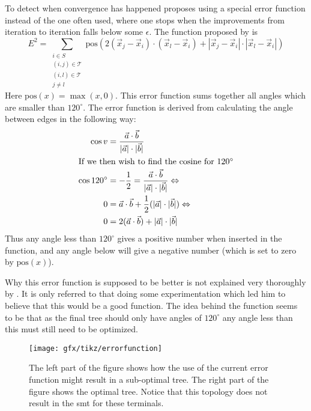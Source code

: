 To detect when convergence has happened \citeauthor{smith1992} proposes using a special
error function instead of the one often used, where one stops when the
improvements from iteration to iteration falls below some $\epsilon$. The
function proposed by \citeauthor{smith1992} is
%
\begin{equation}
  E^2 = \sum_{
    \begin{array}{c} i \in S \\ (i,j) \in \mathcal{T} \\ (i,l) \in \mathcal{T} \\ j \ne l
    \end{array}} \text{pos} (2 (\vec x_j - \vec x_i) \cdot (\vec x_l - \vec x_i)
  + | \vec x_j - \vec x_i | \cdot | \vec x_l - \vec x_i |) \label{eq:28}
\end{equation}
%
Here $\text{pos}(x) = \max(x, 0)$. This error function sums together all angles which
are smaller than $120^{\circ}$. The error function is derived from calculating
the angle between edges in the following way:
%
\begin{align}
  \cos v & = \frac{\vec a \cdot \vec b}
           {|\vec a| \cdot |\vec b|}                 \\
  \intertext{If we then wish to find the cosine for $120^{\circ}$}
  \cos 120^{\circ}
         & = -\frac{1}{2} = \frac{\vec a \cdot \vec b}
           {|\vec a| \cdot |\vec b|} \Leftrightarrow \\
  0      & = \vec a \cdot \vec b + \frac{1}{2}
           (|\vec a| \cdot |\vec b|) \Leftrightarrow \\
  0      & = 2 (\vec a \cdot \vec b) + |\vec a| \cdot |\vec b|
\end{align}
%
Thus any angle less than $120^{\circ}$ gives a positive number when inserted in
the function, and any angle below will give a negative number (which is set to
zero by $\text{pos}(x)$).

Why this error function is supposed to be better is not explained very
thoroughly by \citeauthor{smith1992}. It is only referred to that doing some
experimentation which led him to believe that this would be a good function. The
idea behind the function seems to be that as the final tree should only have
angles of $120^{\circ}$ any angle less than this must still need to be
optimized.

\begin{figure}[htbp]
  \centering
  \texttt{[image: gfx/tikz/errorfunction]}
  \caption[Possible problem with the error function, part 1]{The left part of the figure
    shows how the use of the current error function might result in a sub-optimal
    tree. The right part of the figure shows the optimal tree. Notice that
    this topology does not result in the \ac{smt} for these
    terminals.\label{fig:error-function}}
\end{figure}

